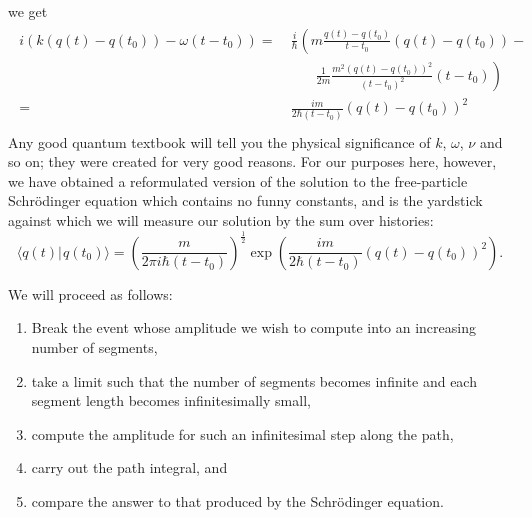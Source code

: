 \documentclass{amsart}
\newcommand{\ket}[1]{\vert \hspace{1pt}#1\rangle}
\newcommand{\braket}[2]{\langle #1 \ket{#2}}
\newcommand{\qv}{q}
\begin{document}
we get
\begin{align*}
\begin{split}
i \left( k (\qv(t) - \qv(t_0)) - \omega (t-t_0)\right) = & \ \frac{i}{\hbar} \left( m \frac{\qv(t) - \qv(t_0)}{t - t_0}(\qv(t) - \qv(t_0)) - \right. \\
	& \qquad \left. \frac{1}{2 m} \frac{m^2 (\qv(t) - \qv(t_0))^2}{(t - t_0)^2}(t - t_0) \right)\\
= & \ \frac{i m}{2 \hbar (t - t_0)} \left(\qv(t) - \qv(t_0) \right)^2\\
\end{split}
\end{align*}
Any good quantum textbook will tell you the physical significance of $k$, $\omega$, $\nu$ and so on; they were created for very good reasons.  For our purposes here, however, we have obtained a reformulated version of the solution to the free-particle Schr\"odinger equation which contains no funny constants, and is the yardstick against which we will measure our solution by the sum over histories:
\begin{equation*}
\braket{\qv(t)}{\qv(t_0)} = \left( \frac{m}{2 \pi i \hbar (t - t_0)}\right)^{\frac{1}{2}} \exp{\left( \frac{i m}{2 \hbar (t - t_0)} \left(\qv(t) - \qv(t_0) \right)^2 \right)}.
\end{equation*}

We will proceed as follows:
\begin{enumerate}
\item{Break the event whose amplitude we wish to compute into an increasing number of segments,}
\item{take a limit such that the number of segments becomes infinite and each segment length becomes infinitesimally small,}
\item{compute the amplitude for such an infinitesimal step along the path,}
\item{carry out the path integral, and}
\item{compare the answer to that produced by the Schr\"odinger equation.}
\end{enumerate}
\end{document}
